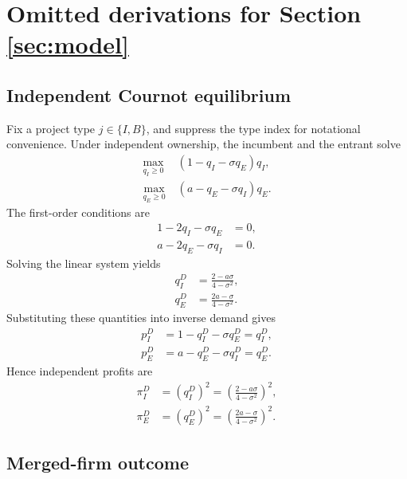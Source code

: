 \section{Omitted derivations for Section \ref{sec:model}}\label{app:modelderivations}

\subsection{Independent Cournot equilibrium}

Fix a project type \(j \in \{I,B\}\), and suppress the type index for notational convenience.
Under independent ownership, the incumbent and the entrant solve
\begin{align}
    \max_{q_I \ge 0}\;& (1-q_I-\sigma q_E)q_I, \\
    \max_{q_E \ge 0}\;& (a-q_E-\sigma q_I)q_E.
\end{align}
The first-order conditions are
\begin{align}
    1-2q_I-\sigma q_E &= 0, \\
    a-2q_E-\sigma q_I &= 0.
\end{align}
Solving the linear system yields
\begin{align}
    q_I^D &= \frac{2-a\sigma}{4-\sigma^2}, \\
    q_E^D &= \frac{2a-\sigma}{4-\sigma^2}.
\end{align}
Substituting these quantities into inverse demand gives
\begin{align}
    p_I^D &= 1-q_I^D-\sigma q_E^D = q_I^D, \\
    p_E^D &= a-q_E^D-\sigma q_I^D = q_E^D.
\end{align}
Hence independent profits are
\begin{align}
    \pi_I^D &= (q_I^D)^2
    = \left(\frac{2-a\sigma}{4-\sigma^2}\right)^2, \\
    \pi_E^D &= (q_E^D)^2
    = \left(\frac{2a-\sigma}{4-\sigma^2}\right)^2.
\end{align}

\subsection{Merged-firm outcome}

